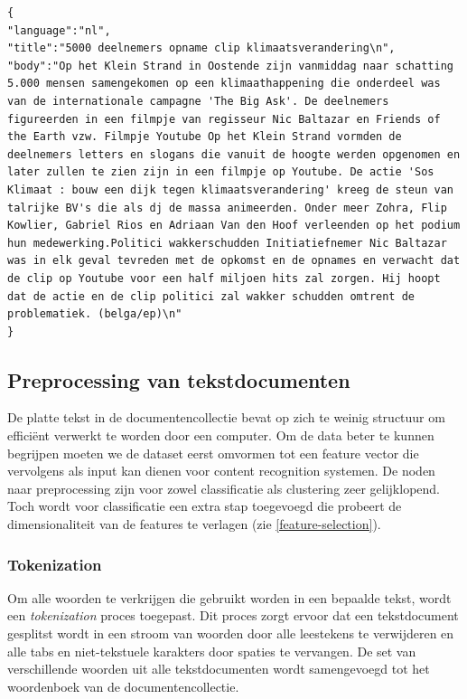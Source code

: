 \begin{lstlisting}[caption=bjorn,label=lst:plaintext]
{
"language":"nl",
"title":"5000 deelnemers opname clip klimaatsverandering\n",
"body":"Op het Klein Strand in Oostende zijn vanmiddag naar schatting 5.000 mensen samengekomen op een klimaathappening die onderdeel was van de internationale campagne 'The Big Ask'. De deelnemers figureerden in een filmpje van regisseur Nic Baltazar en Friends of the Earth vzw. Filmpje Youtube Op het Klein Strand vormden de deelnemers letters en slogans die vanuit de hoogte werden opgenomen en later zullen te zien zijn in een filmpje op Youtube. De actie 'Sos Klimaat : bouw een dijk tegen klimaatsverandering' kreeg de steun van talrijke BV's die als dj de massa animeerden. Onder meer Zohra, Flip Kowlier, Gabriel Rios en Adriaan Van den Hoof verleenden op het podium hun medewerking.Politici wakkerschudden Initiatiefnemer Nic Baltazar was in elk geval tevreden met de opkomst en de opnames en verwacht dat de clip op Youtube voor een half miljoen hits zal zorgen. Hij hoopt dat de actie en de clip politici zal wakker schudden omtrent de problematiek. (belga/ep)\n"
}
\end{lstlisting} 

\subsection{Preprocessing van tekstdocumenten}\label{bag-of-words}\label{preprocessing}
De platte tekst in de documentencollectie bevat op zich te weinig structuur om effici\"ent verwerkt te worden door een computer. Om de data beter te kunnen begrijpen moeten we de dataset eerst omvormen tot een feature vector die vervolgens als input kan dienen voor content recognition systemen. De noden naar preprocessing zijn voor zowel classificatie als clustering zeer gelijklopend. Toch wordt voor classificatie een extra stap toegevoegd die probeert de dimensionaliteit van de features te verlagen (zie \ref{feature-selection}).

\subsubsection{Tokenization}
Om alle woorden te verkrijgen die gebruikt worden in een bepaalde tekst, wordt een \textit{tokenization}\label{tokenization} proces toegepast. Dit proces zorgt ervoor dat een tekstdocument gesplitst wordt in een stroom van woorden door alle leestekens te verwijderen en alle tabs en niet-tekstuele karakters door spaties te vervangen. De set van verschillende woorden uit alle tekstdocumenten wordt samengevoegd tot het woordenboek van de documentencollectie. 

